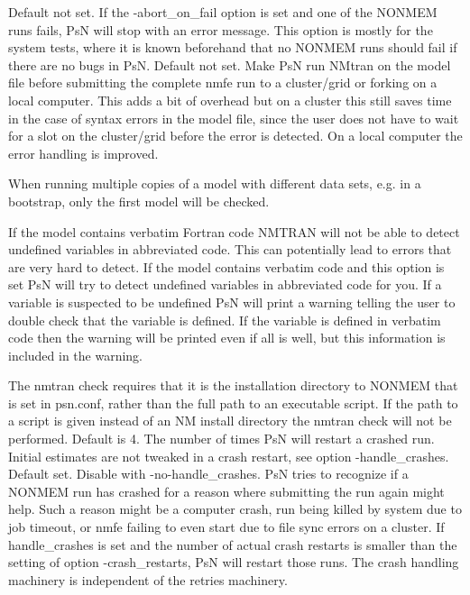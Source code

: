 \begin{optionlist}
Default not set. If the -abort\_on\_fail option is set and one of the NONMEM runs fails, PsN will stop with an error message. This option is mostly for the system tests, where it is known beforehand that no NONMEM runs should fail if there are no bugs in PsN.
\nextopt
{}
Default not set. Make PsN run NMtran on the model file before submitting the complete nmfe run to a cluster/grid or forking on a local computer. This adds a bit of overhead but on a cluster this still saves time in the case of syntax errors in the model file, since the user does not have to wait for a slot on the cluster/grid before the error is detected. On a local computer the error handling is improved.

When running multiple copies of a model with different data sets, e.g. in a bootstrap, only the first model will be checked. 

If the model contains verbatim Fortran code NMTRAN will not be able to detect undefined variables in abbreviated code. This can potentially lead to errors that are very hard to detect. If the model contains verbatim code and this option is set PsN will try to detect undefined variables in abbreviated code for you. If a variable is suspected to be undefined PsN will print a warning telling the user to double check that the variable is defined. If the variable is defined in verbatim code then the warning will be printed even if all is well, but this information is included in the warning. 

The nmtran check requires that it is the installation directory to NONMEM that is set in psn.conf, rather than the full path to an executable script. If the path to a script is given instead of an NM install directory the nmtran check will not be performed.
\nextopt
{}
Default is 4. The number of times PsN will restart a crashed run. Initial estimates are not tweaked in a crash restart, see option
-handle\_crashes.
\nextopt
{}
Default set. Disable with -no-handle\_crashes. PsN tries to recognize if a NONMEM run has crashed for 
a reason where submitting the run again might help. Such a reason might be a computer crash, run being killed by system due to job timeout, or nmfe failing to even start due to file sync errors on a cluster. If handle\_crashes is set and the number of actual crash restarts is smaller than the setting of option -crash\_restarts, PsN will restart those runs. The crash handling machinery is independent of the retries machinery.


\end{optionlist}
